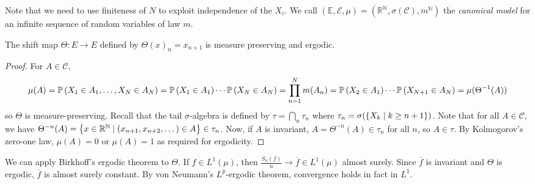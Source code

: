 Note that we need to use finiteness of \( N \) to exploit independence of the \( X_i \).
We call \( (\mathbb E, \mathcal E, \mu) = (\mathbb R^{\mathbb N}, \sigma(\mathcal C), m^{\mathbb N}) \) the \emph{canonical model} for an infinite sequence of random variables of law \( m \).
\begin{theorem}
	The shift map \( \Theta \colon E \to E \) defined by \( \Theta(x)_n = x_{n+1} \) is measure preserving and ergodic.
\end{theorem}
\begin{proof}
	For \( A \in \mathcal C \),
	\[ \mu(A) = \mathbb{P}\left({X_1 \in A_1, \dots, X_N \in A_N}\right) = \mathbb{P}\left({X_1 \in A_1}\right) \cdots \mathbb{P}\left({X_N \in A_N}\right) = \prod_{n=1}^N m(A_n) = \mathbb{P}\left({X_2 \in A_1}\right) \cdots \mathbb{P}\left({X_{N+1} \in A_N}\right) = \mu(\Theta^{-1}(A)) \]
	so \( \Theta \) is measure-preserving.
	Recall that the tail \( \sigma \)-algebra is defined by \( \tau = \bigcap_n \tau_n \) where \( \tau_n = \sigma(\qty{X_k \mid k \geq n + 1}) \).
	Note that for all \( A \in \mathcal C \), we have \( \Theta^{-n}(A) = \qty{x \in \mathbb R^{\mathbb N} \mid (x_{n+1}, x_{n+2}, \dots) \in A} \in \tau_n \).
	Now, if \( A \) is invariant, \( A = \Theta^{-n}(A) \in \tau_n \) for all \( n \), so \( A \in \tau \).
	By Kolmogorov's zero-one law, \( \mu(A) = 0 \) or \( \mu(A) = 1 \) as required for ergodicity.
\end{proof}
We can apply Birkhoff's ergodic theorem to \( \Theta \).
If \( f \in L^1(\mu) \), then \( \frac{S_n(f)}{n} \to \overline f \in L^1(\mu) \) almost surely.
Since \( \overline f \) is invariant and \( \Theta \) is ergodic, \( \overline f \) is almost surely constant.
By von Neumann's \( L^p \)-ergodic theorem, convergence holds in fact in \( L^1 \).

